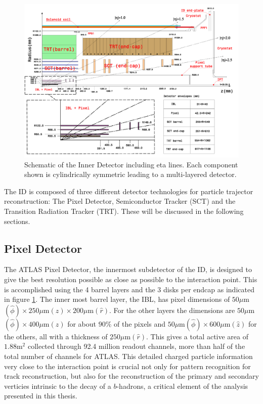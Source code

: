 \begin{figure}[!htbp]
  \begin{center}
    \includegraphics[width=0.8\linewidth]{figures/atlas/inner_detector_schematic}
    \caption{ \cite{PIX-2018-001} Schematic of the Inner Detector including eta
lines.  Each component shown is cylindrically symmetric leading to a
multi-layered detector.}
    \label{fig:inner_detector_schematic}
  \end{center}
\end{figure}

The ID is composed of three different detector technologies for particle
trajector reconstruction: The Pixel Detector, Semiconductor Tracker (SCT) and
the Transition Radiation Tracker (TRT).  These will be discussed in the
following sections. 

\subsection{Pixel Detector}

The ATLAS Pixel Detector, the innermost subdetector of the ID, is designed to
give the best resolution possible as close as possible to the interaction point.
This is accomplished using the 4 barrel layers and the 3 disks per endcap as
indicated in figure \ref{fig:inner_detector_schematic}. The inner most barrel
layer, the IBL, has pixel dimensions of $50\mu $m$(\hat{\phi}) \times 250\mu $m$
(\hat{z}) \times 200\mu $m$(\hat{r})$.  For the other layers the dimensions are
$50\mu $m$(\hat{\phi}) \times 400\mu $m$(\hat{z})$ for about $90\%$ of the pixels
and $50\mu $m$(\hat{\phi}) \times 600\mu $m$(\hat{z})$ for the others, all with a
thickness of $250\mu $m$(\hat{r})$.  This gives a total active area of $1.88 $m$^2$
collected through 92.4 million readout channels, more than half of the total
number of channels for ATLAS. This detailed charged particle information very
close to the interaction point is crucial not only for pattern recognition for
track reconstruction, but also for the reconstruction of the primary and
secondary verticies intrinsic to the decay of a $b$-hadrons, a critical element
of the analysis presented in this thesis.

